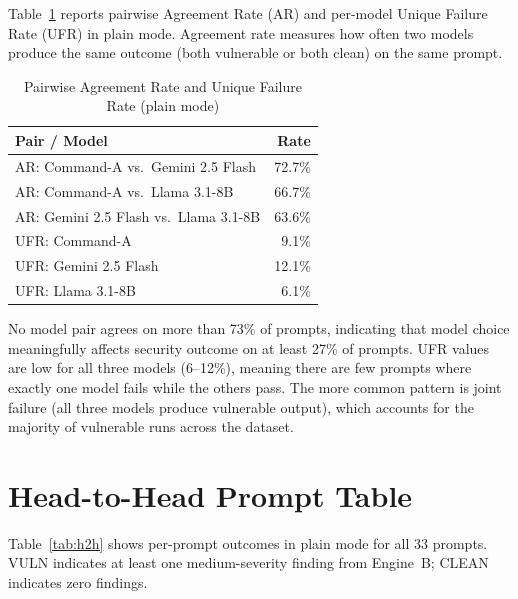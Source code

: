 \documentclass[12pt,a4paper]{report}
\begin{document}
Table~\ref{tab:agreement} reports pairwise Agreement Rate (AR) and per-model
Unique Failure Rate (UFR) in plain mode. Agreement rate measures how often
two models produce the same outcome (both vulnerable or both clean) on the
same prompt.

\begin{table}[H]
\centering
\caption{Pairwise Agreement Rate and Unique Failure Rate (plain mode)}
\label{tab:agreement}
\renewcommand{\arraystretch}{1.3}
\begin{tabular}{@{}lr@{}}
\toprule
\textbf{Pair / Model}                       & \textbf{Rate} \\
\midrule
AR: Command-A vs.\ Gemini 2.5 Flash        & 72.7\% \\
AR: Command-A vs.\ Llama 3.1-8B           & 66.7\% \\
AR: Gemini 2.5 Flash vs.\ Llama 3.1-8B   & 63.6\% \\
\midrule
UFR: Command-A                             &  9.1\% \\
UFR: Gemini 2.5 Flash                     & 12.1\% \\
UFR: Llama 3.1-8B                         &  6.1\% \\
\bottomrule
\end{tabular}
\end{table}

No model pair agrees on more than 73\% of prompts, indicating that model choice
meaningfully affects security outcome on at least 27\% of prompts. UFR values
are low for all three models (6--12\%), meaning there are few prompts where
exactly one model fails while the others pass. The more common pattern is
joint failure (all three models produce vulnerable output), which accounts for
the majority of vulnerable runs across the dataset.

\section{Head-to-Head Prompt Table}
\label{sec:h2h}

Table~\ref{tab:h2h} shows per-prompt outcomes in plain mode for all 33 prompts.
VULN indicates at least one medium-severity finding from Engine~B; CLEAN
indicates zero findings.
\end{document}
